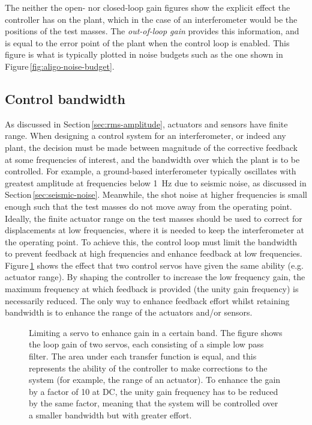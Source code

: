 The neither the open- nor closed-loop gain figures show the explicit effect the controller has on the plant, which in the case of an interferometer would be the positions of the test masses. The \emph{out-of-loop gain} provides this information, and is equal to the error point of the plant when the control loop is enabled. This figure is what is typically plotted in noise budgets such as the one shown in Figure\,\ref{fig:aligo-noise-budget}.

\subsection{\label{sec:control-bandwidth}Control bandwidth}
As discussed in Section\,\ref{sec:rms-amplitude}, actuators and sensors have finite range. When designing a control system for an interferometer, or indeed any plant, the decision must be made between magnitude of the corrective feedback at some frequencies of interest, and the bandwidth over which the plant is to be controlled. For example, a ground-based interferometer typically oscillates with greatest amplitude at frequencies below \SI{1}{\hertz} due to seismic noise, as discussed in Section\,\ref{sec:seismic-noise}. Meanwhile, the shot noise at higher frequencies is small enough such that the test masses do not move away from the operating point. Ideally, the finite actuator range on the test masses should be used to correct for displacements at low frequencies, where it is needed to keep the interferometer at the operating point. To achieve this, the control loop must limit the bandwidth to prevent feedback at high frequencies and enhance feedback at low frequencies. Figure\,\ref{fig:bandwidth} shows the effect that two control servos have given the same ability (e.g. actuator range). By shaping the controller to increase the low frequency gain, the maximum frequency at which feedback is provided (the unity gain frequency) is necessarily reduced. The only way to enhance feedback effort whilst retaining bandwidth is to enhance the range of the actuators and/or sensors.

\begin{figure}
  \centering
  
  \caption[Limiting a servo to enhance gain in a certain band]{\label{fig:bandwidth}Limiting a servo to enhance gain in a certain band. The figure shows the loop gain of two servos, each consisting of a simple low pass filter. The area under each transfer function is equal, and this represents the ability of the controller to make corrections to the system (for example, the range of an actuator). To enhance the gain by a factor of \num{10} at \gls{DC}, the unity gain frequency has to be reduced by the same factor, meaning that the system will be controlled over a smaller bandwidth but with greater effort.}
\end{figure}

